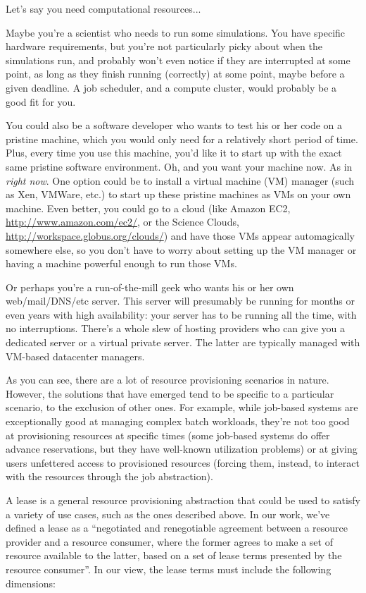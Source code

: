 Let's say you need computational resources...

Maybe you're a scientist who needs to run some simulations. You have specific hardware requirements, but you're not particularly picky about when the simulations run, and probably won't even notice if they are interrupted at some point, as long as they finish running (correctly) at some point, maybe before a given deadline. A job scheduler, and a compute cluster, would probably be a good fit for you.

You could also be a software developer who wants to test his or her code on a pristine machine, which you would only need for a relatively short period of time. Plus, every time you use this machine, you'd like it to start up with the exact same pristine software environment. Oh, and you want your machine now. As in \emph{right now}. One option could be to install a virtual machine (VM) manager (such as Xen, VMWare, etc.) to start up these pristine machines as VMs on your own machine. Even better, you could go to a cloud (like Amazon EC2, \url{http://www.amazon.com/ec2/}, or the Science Clouds, \url{http://workspace.globus.org/clouds/}) and have those VMs appear automagically somewhere else, so you don't have to worry about setting up the VM manager or having a machine powerful enough to run those VMs.

Or perhaps you're a run-of-the-mill geek who wants his or her own web/mail/DNS/etc server. This server will presumably be running for months or even years with high availability: your server has to be running all the time, with no interruptions. There's a whole slew of hosting providers who can give you a dedicated server or a virtual private server. The latter are typically managed with VM-based datacenter managers.

As you can see, there are a lot of resource provisioning scenarios in nature. However, the solutions that have emerged tend to be specific to a particular scenario, to the exclusion of other ones. For example, while job-based systems are exceptionally good at managing complex batch workloads, they're not too good at provisioning resources at specific times (some job-based systems do offer advance reservations, but they have well-known utilization problems) or at giving users unfettered access to provisioned resources (forcing them, instead, to interact with the resources through the job abstraction).

A lease is a general resource provisioning abstraction that could be used to satisfy a variety of use cases, such as the ones described above. In our work, we've defined a lease as a ``negotiated and renegotiable agreement between a resource provider and a resource consumer, where the former agrees to make a set of resource available to the latter, based on a set of lease terms presented by the resource consumer''. In our view, the lease terms must include the following dimensions:

